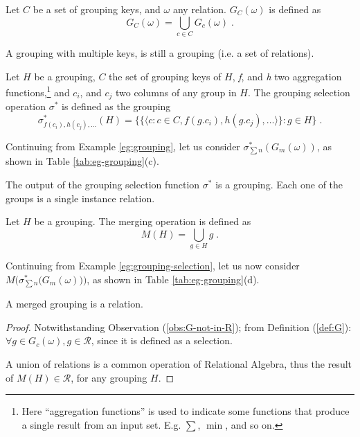 \begin{definition}\label{def:G-keys}
Let $C$ be a set of grouping keys, and $\omega$ any relation.
$G_C(\omega)$ is defined as
$$
G_C(\omega) = \bigcup_{c \in C}G_c(\omega) \; .
$$
\end{definition}

\begin{observation}
A grouping with multiple keys, is still a grouping (i.e. a set of relations).
\end{observation}

\begin{definition}\label{def:sigma*}
Let $H$ be a grouping, $C$ the set of grouping keys of $H$, \emph{f}, and \emph{h} two aggregation functions,\footnote{%
Here ``aggregation functions'' is used to indicate some functions that produce a single result from an input set. E.g. $\sum$, $\min$, and so on.
} and $c_i$, and $c_j$ two columns of any group in $H$.
The grouping selection operation $\sigma^*$ is defined as the grouping
$$
\sigma^*_{f(c_i), h(c_j), \dots}(H) = \Big\{
    \big\{ \langle c : c \in C, f(g.c_i), h(g.c_j), \dots \rangle \big\} : g \in H
\Big\} \; .
$$
\end{definition}

\begin{example}\label{eg:grouping-selection}
Continuing from Example \ref{eg:grouping}, let us consider $\sigma^*_{\sum{n}}(G_m(\omega))$, as shown in Table \ref{tab:eg-grouping}(c).
\end{example}

\begin{observation}
The output of the grouping selection function $\sigma^*$ is a grouping.
Each one of the groups is a single instance relation.
\end{observation}

\begin{definition}
Let $H$ be a grouping. The merging operation is defined as
$$
M(H) = \bigcup_{g \in H} g \; .
$$
\end{definition}

\begin{example}\label{eg:grouping-merge}
Continuing from Example \ref{eg:grouping-selection}, let us now consider $M\Big(\sigma^*_{\sum{n}}\big(G_m(\omega)\big)\Big)$, as shown in Table \ref{tab:eg-grouping}(d).
\end{example}

\begin{proposition}
A merged grouping is a relation.
\end{proposition}
\begin{proof}
Notwithstanding Observation (\ref{obs:G-not-in-R}); from Definition (\ref{def:G}): $\forall g \in G_c(\omega), g \in \mathcal{R}$, since it is defined as a selection.

A union of relations is a common operation of Relational Algebra, thus the result of $M(H) \in \mathcal{R}$, for any grouping $H$. 
\end{proof}

